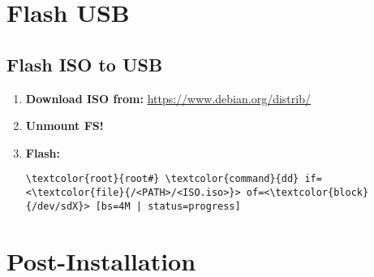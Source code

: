 \documentclass[10pt, a4paper, onecolumn, openany]{book} %
\begin{document}
\chapter{Flash USB}
\section{Flash ISO to USB}
\begin{enumerate}
    \item \textbf{Download ISO from:}
    \newline \underline{\url{https://www.debian.org/distrib/}}
    \item \textbf{Unmount FS!}
    \item \textbf{Flash:}
\begin{Verbatim}[commandchars=\\\{\}]
\textcolor{root}{root#} \textcolor{command}{dd} if=<\textcolor{file}{/<PATH>/<ISO.iso>}> of=<\textcolor{block}{/dev/sdX}> [bs=4M | status=progress]
\end{Verbatim}
\end{enumerate}
\chapter{Post-Installation}
\end{document}
